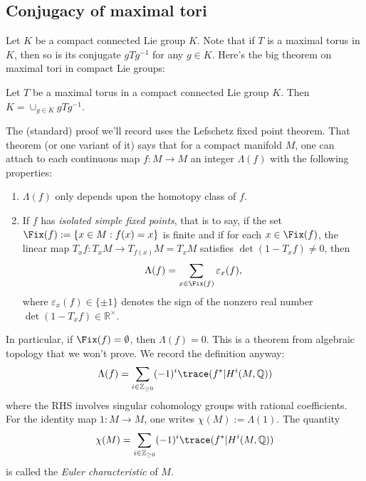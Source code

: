 \documentclass[reqno]{amsart} 
\def\eps{\varepsilon}
\begin{document}
\subsection{Conjugacy of maximal tori}
\label{sec:orgb02c776}
Let $K$ be a compact connected Lie group $K$.  Note that if $T$ is a maximal torus in $K$, then so is its conjugate $g T g^{-1}$ for any $g \in K$.  Here's the big theorem on maximal tori in compact Lie groups:
\begin{theorem}\label{thm:maximal-tori-conjugates-exhaust-K}
  Let $T$ be a maximal torus in a compact connected Lie group $K$.  Then $K = \cup_{g \in K} g T g^{-1}$.
\end{theorem}
The (standard) proof we'll record uses the Lefschetz fixed point theorem.  That theorem (or one variant of it) says that for a compact manifold $M$, one can attach to each continuous map $f : M \rightarrow M$ an integer $\Lambda(f)$ with the following properties:
\begin{enumerate}
\item $\Lambda(f)$ only depends upon the homotopy class of $f$.
\item If $f$ has \emph{isolated simple fixed points}, that is to say, if the set $\Fix(f) := \{x \in M : f(x) = x\}$ is finite and if for each $x \in \Fix(f)$, the linear map $T_x f : T_x M \rightarrow T_{f(x)} M = T_x M$ satisfies $\det(1 - T_x f) \neq 0$, then
  \begin{equation*}
    \Lambda(f) = \sum_{x \in \Fix(f)} \eps_x(f),
  \end{equation*}
  where $\eps_x(f) \in \{\pm 1\}$ denotes the sign of the nonzero real number $\det(1 - T_x f) \in \mathbb{R}^\times$.
\end{enumerate}
In particular, if $\Fix(f) = \emptyset$, then $\Lambda(f) = 0$.  This is a theorem from algebraic topology that we won't prove.  We record the definition anyway:
\begin{equation*}
  \Lambda(f) = \sum_{i \in \mathbb{Z}_{\geq 0}} (-1)^i \trace(f^* | H^i(M,\mathbb{Q}))
\end{equation*}
where the RHS involves singular cohomology groups with rational coefficients.  For the identity map $1 : M \rightarrow M$, one writes $\chi(M) := \Lambda(1)$.  The quantity
\begin{equation*}
  \chi(M) = \sum_{i \in \mathbb{Z}_{\geq 0}} (-1)^i \trace(f^* | H^i(M,\mathbb{Q}))
\end{equation*}
is called the \emph{Euler characteristic} of $M$.
\end{document}

